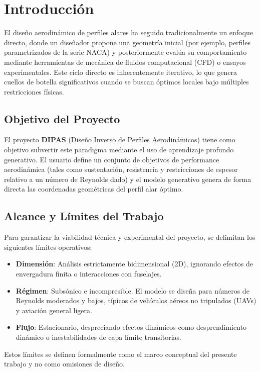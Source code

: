 \section{Introducción}
\label{sec:introduccion}

El diseño aerodinámico de perfiles alares ha seguido tradicionalmente un enfoque directo, donde un diseñador propone una geometría inicial (por ejemplo, perfiles parametrizados de la serie NACA) y posteriormente evalúa su comportamiento mediante herramientas de mecánica de fluidos computacional (CFD) o ensayos experimentales. Este ciclo directo es inherentemente iterativo, lo que genera cuellos de botella significativos cuando se buscan óptimos locales bajo múltiples restricciones físicas.

\subsection{Objetivo del Proyecto}
El proyecto \textbf{DIPAS} (Diseño Inverso de Perfiles Aerodinámicos) tiene como objetivo subvertir este paradigma mediante el uso de aprendizaje profundo generativo. El usuario define un conjunto de objetivos de performance aerodinámica (tales como sustentación, resistencia y restricciones de espesor relativo a un número de Reynolds dado) y el modelo generativo genera de forma directa las coordenadas geométricas del perfil alar óptimo.

\subsection{Alcance y Límites del Trabajo}
Para garantizar la viabilidad técnica y experimental del proyecto, se delimitan los siguientes límites operativos:
\begin{itemize}
    \item \textbf{Dimensión}: Análisis estrictamente bidimensional (2D), ignorando efectos de envergadura finita o interacciones con fuselajes.
    \item \textbf{Régimen}: Subsónico e incompresible. El modelo se diseña para números de Reynolds moderados y bajos, típicos de vehículos aéreos no tripulados (UAVs) y aviación general ligera.
    \item \textbf{Flujo}: Estacionario, despreciando efectos dinámicos como desprendimiento dinámico o inestabilidades de capa límite transitorias.
\end{itemize}
Estos límites se definen formalmente como el marco conceptual del presente trabajo y no como omisiones de diseño.
